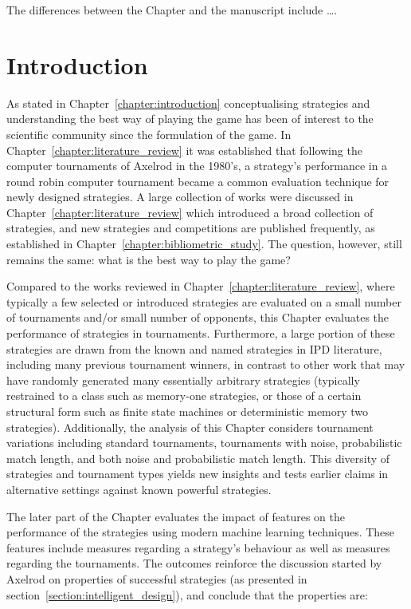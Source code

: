 \hrulefill

The differences between the Chapter and the manuscript include \dots.

\section{Introduction}

As stated in Chapter~\ref{chapter:introduction} conceptualising strategies and
understanding the best way of playing the game has been of interest to the
scientific community since the formulation of the game. In
Chapter~\ref{chapter:literature_review} it was established that following the
computer tournaments of Axelrod in the 1980's, a strategy's performance in a
round robin computer tournament became a common evaluation technique for newly
designed strategies. A large collection of works were discussed in
Chapter~\ref{chapter:literature_review} which introduced a broad collection of
strategies, and new strategies and competitions are published frequently,
as established in Chapter~\ref{chapter:bibliometric_study}. The question,
however, still remains the same: what is the best way to play the game?

Compared to the works reviewed in Chapter~\ref{chapter:literature_review}, where
typically a few selected or introduced strategies are evaluated on a small
number of tournaments and/or small number of opponents, this Chapter evaluates
the performance of \numberofstrategies strategies in \numberofalltournaments
tournaments. Furthermore, a large portion of these strategies are drawn from the
known and named strategies in IPD literature, including many previous tournament
winners, in contrast to other work that may have randomly generated many
essentially arbitrary strategies (typically restrained to a class such as
memory-one strategies, or those of a certain structural form such as finite
state machines or deterministic memory two strategies). Additionally, the
analysis of this Chapter considers tournament variations including standard
tournaments, tournaments with noise, probabilistic match length, and both noise
and probabilistic match length. This diversity of strategies and tournament
types yields new insights and tests earlier claims in alternative settings
against known powerful strategies.

The later part of the Chapter evaluates the impact of features on the
performance of the strategies using modern machine learning techniques. These
features include measures regarding a strategy's behaviour as well as measures
regarding the tournaments. The outcomes reinforce the discussion started by
Axelrod on properties of successful strategies (as presented in
section~\ref{section:intelligent_design}), and conclude that the properties are:

